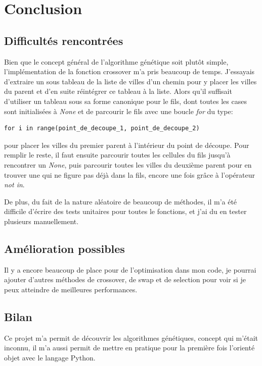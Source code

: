 \documentclass[12pt]{article}
\begin{document}
\section{Conclusion}

\subsection{Difficultés rencontrées}
Bien que le concept général de l'algorithme génétique soit plutôt simple, l'implémentation de la fonction crossover m'a pris beaucoup
de temps. J'essayais d'extraire un sous tableau de la liste de villes d'un chemin pour y placer les villes du parent et d'en suite réintégrer
ce tableau à la liste. Alors qu'il suffisait d'utiliser un tableau sous sa forme canonique pour le fils, dont toutes les cases sont initialisées à
\emph{None} et de parcourir le fils avec une boucle \emph{for} du type:
\begin{verbatim}
for i in range(point_de_decoupe_1, point_de_decoupe_2)
\end{verbatim}
pour placer les villes du premier parent à l'intérieur du point de découpe. Pour remplir le reste, il faut ensuite parcourir toutes les cellules du fils
jusqu'à rencontrer un \emph{None}, puis parcourir toutes les villes du deuxième parent pour en trouver une qui ne figure pas déjà dans la fils, encore
une fois grâce à l'opérateur \emph{not in}.

De plus, du fait de la nature aléatoire de beaucoup de méthodes, il m'a été difficile d'écrire des tests unitaires pour toutes le fonctions, et j'ai du
en tester plusieurs manuellement.

\subsection{Amélioration possibles}

Il y a encore beaucoup de place pour de l'optimisation dans mon code, je pourrai ajouter d'autres méthodes de crossover, de swap et de
selection pour voir si je peux atteindre de meilleures performances.

\subsection{Bilan}

Ce projet m'a permit de découvrir les algorithmes génétiques, concept qui m'était inconnu, il m'a aussi permit de mettre en pratique pour la première
fois l'orienté objet avec le langage Python.
\end{document}

